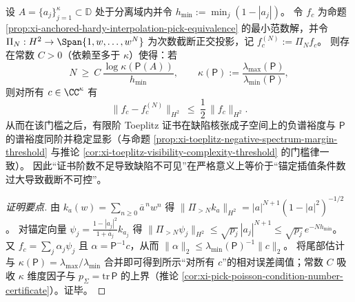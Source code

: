 \begin{proposition}\label{prop:xi-toeplitz-threshold-via-anchored-interpolation}
设 \(A=\{a_j\}_{j=1}^{\kappa}\subset\mathbb{D}\) 处于分离域内并令 \(h_{\min}:=\min_j(1-|a_j|)\)。
令 \(f_c\) 为命题 \ref{prop:xi-anchored-hardy-interpolation-pick-equivalence} 的最小范数解，并令 \(\Pi_N:H^2\to\Span\{1,w,\dots,w^N\}\) 为次数截断正交投影，记 \(f_c^{(N)}:=\Pi_N f_c\)。
则存在常数 \(C>0\)（依赖至多于 \(\kappa\)）使得：若
\[
\boxed{\;
N\ \ge\ C\,\frac{\log\kappa(\mathsf P(A))}{h_{\min}},\qquad
\kappa(\mathsf P):=\frac{\lambda_{\max}(\mathsf P)}{\lambda_{\min}(\mathsf P)},\;}
\]
则对所有 \(c\in\CC^{\kappa}\) 有
\[
\boxed{\;
\|f_c-f_c^{(N)}\|_{H^2}\ \le\ \frac12\,\|f_c\|_{H^2}.\;}
\]
从而在该门槛之后，有限阶 Toeplitz 证书在缺陷核张成子空间上的负谱裕度与 \(\mathsf P\) 的谱裕度同阶并稳定显影（与命题 \ref{prop:xi-toeplitz-negative-spectrum-margin-threshold} 与推论 \ref{cor:xi-toeplitz-visibility-complexity-threshold} 的门槛律一致）。
因此“证书阶数不足导致缺陷不可见”在严格意义上等价于“锚定插值条件数过大导致截断不可控”。
\end{proposition}
\begin{proof}[证明要点]
由 \(k_{a}(w)=\sum_{n\ge 0}\overline a^{\,n}w^n\) 得 \(\|\Pi_{>N}k_a\|_{H^2}=|a|^{N+1}(1-|a|^2)^{-1/2}\)。
对锚定向量 \(\psi_j=\frac{1-|a_j|^2}{1+\overline a_j}k_{a_j}\) 得
\(
\|\Pi_{>N}\psi_j\|_{H^2}\le \sqrt{p_j}\,|a_j|^{N+1}\le \sqrt{p_j}\,e^{-Nh_{\min}}
\)。
又 \(f_c=\sum_j\alpha_j\psi_j\) 且 \(\alpha=\mathsf P^{-1}c\)，从而 \(\|\alpha\|_2\le \lambda_{\min}(\mathsf P)^{-1}\|c\|_2\)。
将尾部估计与 \(\kappa(\mathsf P)=\lambda_{\max}/\lambda_{\min}\) 合并即可得到所示“对所有 \(c\)”的相对误差阈值；常数 \(C\) 吸收 \(\kappa\) 维度因子与 \(p_\Sigma=\mathrm{tr}\,\mathsf P\) 的上界（推论 \ref{cor:xi-pick-poisson-condition-number-certificate}）。证毕。
\end{proof}

